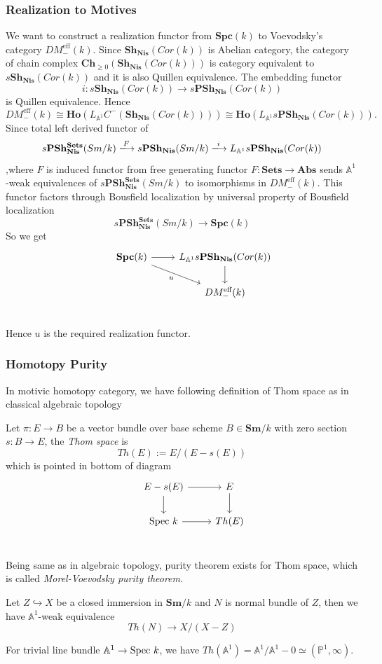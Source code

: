 \documentclass[b5paper,10pt]{article}
\begin{document}
\subsubsection{Realization to Motives}
We want to construct a realization functor from $\mathbf{Spc}(k)$ to Voevodsky's category $DM_{-}^{\text{eff}}(k)$.
Since $\mathbf{Sh_{Nis}}(Cor(k))$ is Abelian category, the category of chain complex $\mathbf{Ch}_{\geq 0}(\mathbf{Sh_{Nis}}(Cor(k)))$ is category equivalent to $s\mathbf{Sh_{Nis}}(Cor(k))$ and it is also Quillen equivalence. The embedding functor
\[
i \colon s\mathbf{Sh_{Nis}}(Cor(k)) \to s\mathbf{PSh_{Nis}}(Cor(k))
\]
is Quillen equivalence. 
Hence \[DM_{-}^{\text{eff}}(k) \cong \mathbf{Ho}(L_{\mathbb{A}^1}C^{-}(\mathbf{Sh_{Nis}}(Cor(k)))) \cong
 \mathbf{Ho}(L_{\mathbb{A}^1}s\mathbf{PSh_{Nis}}(Cor(k))).\]
 Since total left derived functor of 
 \[
 s\mathbf{PSh_{Nis}^{Sets}}(Sm/k) 
 \xlongrightarrow{F} s\mathbf{PSh_{Nis}}(Sm/k) \xlongrightarrow{i} L_{\mathbb{A}^1}s\mathbf{PSh_{Nis}}(Cor(k))
 \]
,where $F$ is induced functor from free generating functor $F \colon \mathbf{Sets} \to \mathbf{Abs}$ sends $\mathbb{A}^1$-weak equivalences of $s\mathbf{PSh_{Nis}^{Sets}}(Sm/k)$ to isomorphisms in  $DM_{-}^{\text{eff}}(k)$. This functor factors through Bousfield localization by universal property of Bousfield localization
\[
 s\mathbf{PSh_{Nis}^{Sets}}(Sm/k) \to \mathbf{Spc}(k)
\]
So we get 
\[
\begin{tikzcd}
&\mathbf{Spc}(k) \arrow[r] \arrow[rd,"u"']& L_{\mathbb{A}^1}s\mathbf{PSh_{Nis}}(Cor(k)) \arrow[d]\\
& & DM_{-}^{\text{eff}}(k)\\
\end{tikzcd}
\]
 Hence $u$ is the required realization functor.
\subsubsection{Homotopy Purity}
In motivic homotopy category, we have following definition of Thom space as in classical algebraic topology
\begin{secdefn}
	Let $\pi \colon E \to B$ be a vector bundle over base scheme $B \in \mathbf{Sm}/k$ with zero section $s: B \to E$, the \emph{Thom space} is
	\[
	Th(E):= E/(E-s(E))
	\]
	which is pointed in bottom of diagram
	\[
	\begin{tikzcd}
	&E-s(E) \ar[r] \ar[d] & E \ar[d]\\
	&\spec k \ar[r]& Th(E)\\
	\end{tikzcd}
	\]
\end{secdefn}
Being same as in algebraic topology, purity theorem exists for Thom space, which is called \emph{Morel-Voevodsky purity theorem}.
\begin{secthm}
	Let $Z \hookrightarrow X$ be a closed immersion in $\mathbf{Sm}/k$ and $N$ is normal bundle of $Z$, then we have $\mathbb{A}^1$-weak equivalence
	\[
	Th(N) \to X/(X-Z)
	\]
\end{secthm}
\begin{ex}
	For trivial line bundle $\mathbb{A}^1 \to \text{Spec } k$, we have $Th(\mathbb{A}^1)= \mathbb{A}^1/\mathbb{A}^1 -0 \simeq (\mathbb{P}^1,\infty)$. 
\end{ex}
\end{document}

